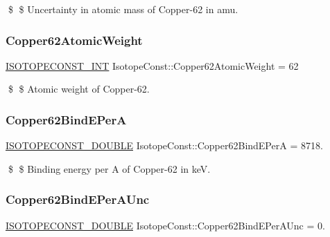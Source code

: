 \$ \$ Uncertainty in atomic mass of Copper-\/62 in amu. \mbox{\label{group___isotope_const-_copper-_cu62_ga5b3018c28263450692e95b01da4769bf}} 
\subsubsection{\texorpdfstring{Copper62\+Atomic\+Weight}{Copper62AtomicWeight}}
{\footnotesize\ttfamily \mbox{\hyperlink{group___isotope_const-_macros_ga5f18360b3e99483a35c32d789e62621c}{I\+S\+O\+T\+O\+P\+E\+C\+O\+N\+S\+T\+\_\+\+I\+NT}} Isotope\+Const\+::\+Copper62\+Atomic\+Weight = 62}

\$ \$ Atomic weight of Copper-\/62. \mbox{\label{group___isotope_const-_copper-_cu62_gadb394b878f932f1b5bc448d4c728f4de}} 
\subsubsection{\texorpdfstring{Copper62\+Bind\+E\+PerA}{Copper62BindEPerA}}
{\footnotesize\ttfamily \mbox{\hyperlink{group___isotope_const-_macros_ga8f45a7272ce02c0b4c65c44636ed719a}{I\+S\+O\+T\+O\+P\+E\+C\+O\+N\+S\+T\+\_\+\+D\+O\+U\+B\+LE}} Isotope\+Const\+::\+Copper62\+Bind\+E\+PerA = 8718.}

\$ \$ Binding energy per A of Copper-\/62 in keV. \mbox{\label{group___isotope_const-_copper-_cu62_ga0c4ae240089cd1be980db5909e0ca12f}} 
\subsubsection{\texorpdfstring{Copper62\+Bind\+E\+Per\+A\+Unc}{Copper62BindEPerAUnc}}
{\footnotesize\ttfamily \mbox{\hyperlink{group___isotope_const-_macros_ga8f45a7272ce02c0b4c65c44636ed719a}{I\+S\+O\+T\+O\+P\+E\+C\+O\+N\+S\+T\+\_\+\+D\+O\+U\+B\+LE}} Isotope\+Const\+::\+Copper62\+Bind\+E\+Per\+A\+Unc = 0.}

